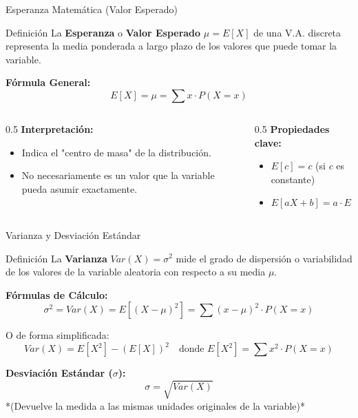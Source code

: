\documentclass[aspectratio=169, 10pt]{beamer}
\begin{document}
\begin{frame}{Esperanza Matemática (Valor Esperado)}
    \begin{block}{Definición}
        La \textbf{Esperanza} o \textbf{Valor Esperado} $\mu = E[X]$ de una V.A. discreta representa la media ponderada a largo plazo de los valores que puede tomar la variable.
    \end{block}

    \vspace{0.2cm}
    \textbf{Fórmula General:}
    $$E[X] = \mu = \sum x \cdot P(X = x)$$

    \begin{columns}
        \begin{column}{0.5\textwidth}
            \textbf{Interpretación:}
            \begin{itemize}
                \item Indica el "centro de masa" de la distribución.
                \item No necesariamente es un valor que la variable pueda asumir exactamente.
            \end{itemize}
        \end{column}
        \begin{column}{0.5\textwidth}
            \textbf{Propiedades clave:}
            \begin{itemize}
                \item $E[c] = c$ (si $c$ es constante)
                \item $E[aX + b] = a \cdot E[X] + b$
            \end{itemize}
        \end{column}
    \end{columns}
\end{frame}

\begin{frame}{Varianza y Desviación Estándar}
    \begin{block}{Definición}
        La \textbf{Varianza} $Var(X) = \sigma^2$ mide el grado de dispersión o variabilidad de los valores de la variable aleatoria con respecto a su media $\mu$.
    \end{block}

    \vspace{0.2cm}
    \textbf{Fórmulas de Cálculo:}
    $$\sigma^2 = Var(X) = E[(X - \mu)^2] = \sum (x - \mu)^2 \cdot P(X = x)$$
    
    O de forma simplificada:
    $$Var(X) = E[X^2] - (E[X])^2 \quad \text{donde } E[X^2] = \sum x^2 \cdot P(X = x)$$

    \vspace{0.2cm}
    \textbf{Desviación Estándar ($\sigma$):}
    $$\sigma = \sqrt{Var(X)}$$
    *(Devuelve la medida a las mismas unidades originales de la variable)*
\end{frame}
\end{document}
